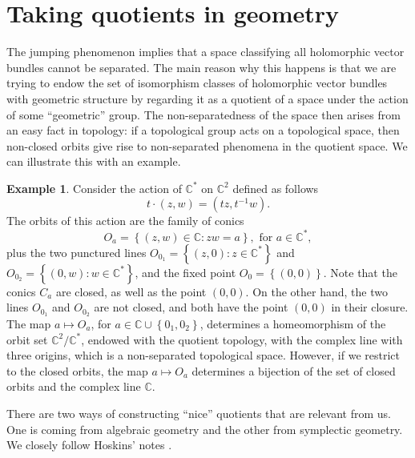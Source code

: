 \documentclass[12pt,a4paper]{amsbook}
\theoremstyle{remark} \newtheorem{rmk}[thm]{Remark}
\theoremstyle{definition} \newtheorem{defn}[thm]{Definition}
\theoremstyle{definition} \newtheorem{ex}[thm]{Example}
\theoremstyle{definition} \newtheorem{ej}{Exercise}
\newcommand{\C}{\mathbb C}
\begin{document}
\section{Taking quotients in geometry} \label{ss:quotients}
The jumping phenomenon implies that a space classifying all holomorphic vector bundles cannot be separated. The main reason why this happens is that we are trying to endow the set of isomorphism classes of holomorphic vector bundles with geometric structure by regarding it as a quotient of a space under the action of some ``geometric'' group. The non-separatedness of the space then arises from an easy fact in topology: if a topological group acts on a topological space, then non-closed orbits give rise to non-separated phenomena in the quotient space. We can illustrate this with an example.

\begin{ex}
  Consider the action of $\C^*$ on $\C^2$ defined as follows
  \begin{equation*}
t \cdot (z,w) = (t z, t^{-1} w).
  \end{equation*}
  The orbits of this action are the family of conics
  \begin{equation*}
O_a = \left\{(z,w)\in \C : zw=a \right\}, \text{ for } a \in \C^*,
  \end{equation*}
  plus the two punctured lines $O_{0_1}=\left\{ (z,0): z\in \C^* \right\}$ and $O_{0_2}=\left\{ (0,w): w\in \C^* \right\}$, and the fixed point $O_{0}=\left\{ (0,0) \right\}$. Note that the conics $C_a$ are closed, as well as the point $(0,0)$. On the other hand, the two lines $O_{0_1}$ and $O_{0_2}$ are not closed, and both have the point $(0,0)$ in their closure. The map $a\mapsto O_{a}$, for $a\in \C \cup \left\{0_1,0_2 \right\}$, determines a homeomorphism of the orbit set $\C^2/\C^*$, endowed with the quotient topology, with the complex line with three origins, which is a non-separated topological space. However, if we restrict to the closed orbits, the map $a\mapsto O_a$ determines a bijection of the set of closed orbits and the complex line $\C$.
  \end{ex}

  There are two ways of constructing ``nice'' quotients that are relevant from us. One is coming from algebraic geometry and the other from symplectic geometry. We closely follow Hoskins' notes \cite{Hoskins}.
\end{document}
